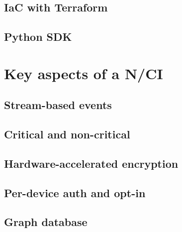 \subsection{IaC with Terraform}
\label{chapter4-iac-with-terraform}

\subsection{Python SDK}
\label{chapter4-python-sdk}

\section{Key aspects of a N/CI}
\label{chapter4-key-aspects}

\subsection{Stream-based events}
\label{chapter4-stream-based-events}

\subsection{Critical and non-critical}
\label{chapter4-critical-and-non-critical}

\subsection{Hardware-accelerated encryption}
\label{chapter4-hardware-accelerated-encryption}

\subsection{Per-device auth and opt-in}
\label{chapter4-user-side-opt-in}

\subsection{Graph database}
\label{chapter4-graph-database}


